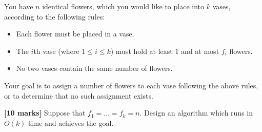 \documentclass{article}
\begin{document}
\setcounter{question}{0}

\begin{Question}
You have $n$ identical flowers, which you would like to place into $k$ vases, according to the following rules:

\begin{itemize}
    \item Each flower must be placed in a vase.
    \item The $i$th vase (where $1 \le i \le k$) must hold at least $1$ and at most $f_i$ flowers.
    \item No two vases contain the same number of flowers.
\end{itemize}

Your goal is to assign a number of flowers to each vase following the above rules, or to determine that no such assignment exists.

\begin{Subquestion}
\textbf{[10 marks]} Suppose that $f_1 = \ldots = f_k = n$. Design an algorithm which runs in $O(k)$ time and achieves the goal.


\end{Subquestion}
\end{Question}
\end{document}
